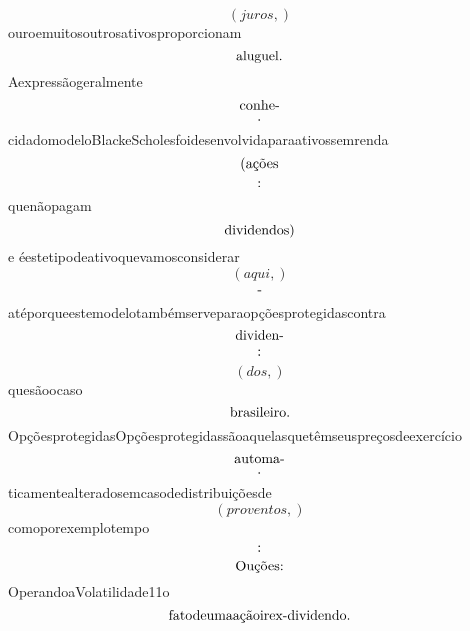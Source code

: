 \documentclass{article}
\begin{document}
\begin{equation}
\left( juros,\right)
\end{equation}ouroemuitosoutrosativosproporcionam\begin{equation}
$aluguel.$
\end{equation}Aexpressãogeralmente\begin{equation}
$conhe-$
\end{equation}\begin{equation}
$.$
\end{equation}cidadomodeloBlackeScholesfoidesenvolvidaparaativossemrenda\begin{equation}
$(ações$
\end{equation}\begin{equation}
$:$
\end{equation}quenãopagam\begin{equation}
$dividendos)$
\end{equation}e éestetipodeativoquevamosconsiderar\begin{equation}
\left( aqui,\right)
\end{equation}\begin{equation}
$-$
\end{equation}atéporqueestemodelotambémserveparaopçõesprotegidascontra\begin{equation}
$dividen-$
\end{equation}\begin{equation}
$:$
\end{equation}\begin{equation}
\left( dos,\right)
\end{equation}quesãoocaso\begin{equation}
$brasileiro.$
\end{equation}OpçõesprotegidasOpçõesprotegidassãoaquelasquetêmseuspreçosdeexercício\begin{equation}
$automa-$
\end{equation}\begin{equation}
$.$
\end{equation}ticamentealteradosemcasodedistribuiçõesde\begin{equation}
\left( proventos,\right)
\end{equation}comoporexemplotempo\begin{equation}
$:$
\end{equation}\begin{equation}
$Ouções:$
\end{equation}OperandoaVolatilidade11o\begin{equation}
$fatodeumaaçãoirex-dividendo.$

\end{equation}
\end{document}
